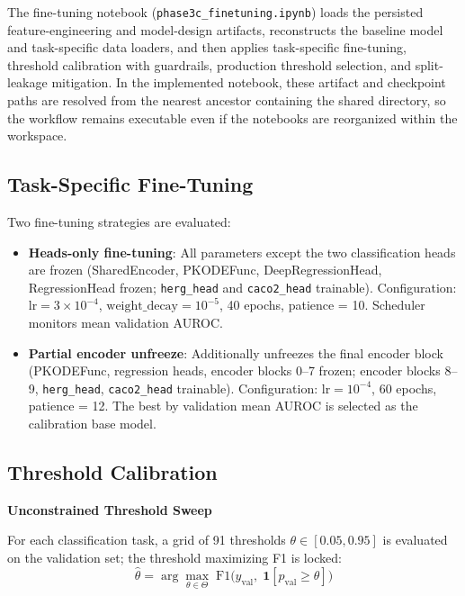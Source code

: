 \documentclass[a4paper,11pt,twoside]{report}
\begin{document}
The fine-tuning notebook (\texttt{phase3c\_finetuning.ipynb}) loads the persisted feature-engineering and model-design artifacts, reconstructs the baseline model and task-specific data loaders, and then applies task-specific fine-tuning, threshold calibration with guardrails, production threshold selection, and split-leakage mitigation. In the implemented notebook, these artifact and checkpoint paths are resolved from the nearest ancestor containing the shared  directory, so the workflow remains executable even if the notebooks are reorganized within the  workspace.


\subsection{Task-Specific Fine-Tuning}

Two fine-tuning strategies are evaluated:
\begin{itemize}
  \item \textbf{Heads-only fine-tuning}: All parameters except the two classification heads are frozen (SharedEncoder, PKODEFunc, DeepRegressionHead, RegressionHead frozen; \texttt{herg\_head} and \texttt{caco2\_head} trainable). Configuration: $\text{lr} = 3\times10^{-4}$, $\text{weight\_decay} = 10^{-5}$, 40 epochs, patience = 10. Scheduler monitors mean validation AUROC.
  \item \textbf{Partial encoder unfreeze}: Additionally unfreezes the final encoder block (PKODEFunc, regression heads, encoder blocks 0--7 frozen; encoder blocks 8--9, \texttt{herg\_head}, \texttt{caco2\_head} trainable). Configuration: $\text{lr} = 10^{-4}$, 60 epochs, patience = 12. The best by validation mean AUROC is selected as the calibration base model.
\end{itemize}

\subsection{Threshold Calibration}

\noindent\textbf{Unconstrained Threshold Sweep}\par\medskip

For each classification task, a grid of 91 thresholds $\theta \in [0.05, 0.95]$ is evaluated on the validation set; the threshold maximizing F1 is locked:
\[
  \hat{\theta} = \arg\max_{\theta \in \Theta}\; \text{F1}\bigl(y_{\text{val}},\; \mathbf{1}[p_{\text{val}} \geq \theta]\bigr)
\]
\end{document}
